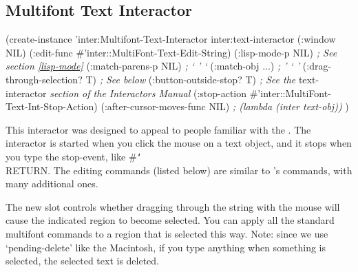 \subsection{Multifont Text Interactor}
\label{multifontkeyboardcmds}

\begin{programexample}

(create-instance 'inter:Multifont-Text-Interactor inter:text-interactor
   (:window NIL)
   (:edit-func \#'inter::MultiFont-Text-Edit-String)
   (:lisp-mode-p NIL)             {\it ; See section \ref{lisp-mode}}
   (:match-parens-p NIL)          {\it ;  `        '          `}
   (:match-obj ...)               {\it ;  '        `          '}
   (:drag-through-selection? T)   {\it ; See below}
   (:button-outside-stop?    T)   {\it ; See the} text-interactor {\it section of the Interactors Manual}
   (:stop-action \#'inter::MultiFont-Text-Int-Stop-Action)
   (:after-cursor-moves-func NIL) {\it ; (lambda (inter text-obj))}
   )
\end{programexample}

This interactor was designed to appeal to people familiar with the
.  The interactor is started when you click
the mouse on a text object, and it stops when you type the stop-event,
like \#{\tt\char`\\}RETURN.  The editing commands (listed below) are similar to
's commands, with many additional ones.

The new slot  controls whether dragging
through the string with the mouse will cause the indicated region to
become selected.  You can apply all the standard multifont commands to
a region that is selected this way.  Note: since we use `pending-delete'
like the Macintosh, if you type anything when something is selected,
the selected text is deleted.

